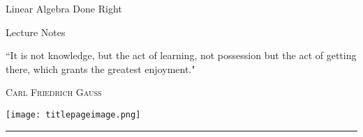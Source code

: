 \begin{titlepage}
\color{Goldenrod}
\pagecolor{titlepagecolor}
\noindent
\titlefont Linear Algebra Done Right \par
\subtitlefont Lecture Notes \par
\epigraph{``It is not knowledge, but the act of learning,
 not possession but the act of getting there,
 which grants the greatest enjoyment."}%
{\textsc{Carl Friedrich Gauss}}
\noindent
\center \texttt{[image: titlepageimage.png]}
\null\vfill
\vspace*{1cm}
\noindent
\hfill
\begin{minipage}{0.35\linewidth}
    \begin{flushright}
        \printauthor
    \end{flushright}
\end{minipage}
%
\begin{minipage}{0.02\linewidth}
    \rule{1pt}{125pt}
\end{minipage}
\end{titlepage}

\nopagecolor
\fontsize{9}{10}\selectfont
\setcounter{tocdepth}{2} 
\tableofcontents